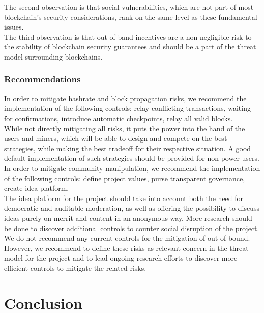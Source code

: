 \documentclass[12pt,a4paper]{article}
\begin{document}
The second observation is that social vulnerabilities, which are not part of most blockchain's security considerations, rank on the same level as these fundamental issues.\\

The third observation is that out-of-band incentives are a non-negligible risk to the stability of blockchain security guarantees and should be a part of the threat model surrounding \gls{blockchain}s.\\

\subsubsection{Recommendations}

In order to mitigate \gls{hashrate} and block propagation risks, we recommend the implementation of the following controls: relay conflicting transactions, waiting for confirmations, introduce automatic checkpoints, relay all valid blocks.\\

While not directly mitigating all risks, it puts the power into the hand of the users and miners, which will be able to design and compete on the best strategies, while making the best tradeoff for their respective situation. A good default implementation of such strategies should be provided for non-power users.\\

In order to mitigate community manipulation, we recommend the implementation of the following controls: define project values, purse transparent governance, create idea platform.\\

The idea platform for the project should take into account both the need for democratic and auditable moderation, as well as offering the possibility to discuss ideas purely on merrit and content in an anonymous way. More research should be done to discover additional controls to counter social disruption of the project.\\

We do not recommend any current controls for the mitigation of out-of-bound. However, we recommend to define these risks as relevant concern in the threat model for the project and to lead ongoing research efforts to discover more efficient controls to mitigate the related risks.\\

\section{Conclusion}
\end{document}
